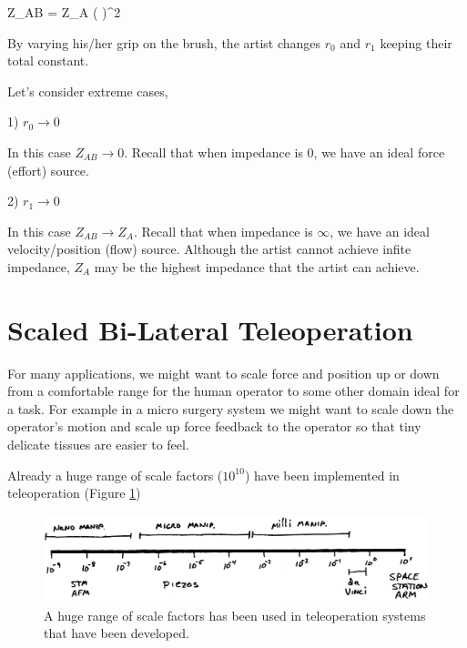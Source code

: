\bq
Z_{AB} = Z_A \left(  \right)^2
\eq

By varying his/her grip on the brush, the artist changes $r_0$ and $r_1$ keeping their total constant.

Let's consider extreme cases,

1)  $r_0 \rightarrow 0$

In this case $Z_{AB} \rightarrow 0$.    Recall that when impedance is 0, we have an ideal force (effort) source.


2)  $r_1 \rightarrow 0$

In this case $Z_{AB} \rightarrow Z_A$.     Recall that when impedance is $\infty$, we have an ideal velocity/position (flow) source.  Although the artist cannot achieve infite impedance, $Z_A$ may be the highest impedance that the artist can achieve.



\section{Scaled Bi-Lateral Teleoperation}

For many applications, we might want to scale force and position up or down from a comfortable range for the human operator to some other domain ideal for a task.  For example in a micro surgery system we might want to scale down the operator's motion and scale up force feedback to the operator so that tiny delicate tissues are easier to feel.	%

Already a huge range of scale factors ($10^{10}$) have been implemented in teleoperation (Figure \ref{ScaleRange})

\begin{figure}[h]	%
\centering \includegraphics[width=4.5in]{figs14/00317.eps}
\caption{A huge range of scale factors has been used in teleoperation systems that have been developed.}\label{ScaleRange}	%
\end{figure}	%


